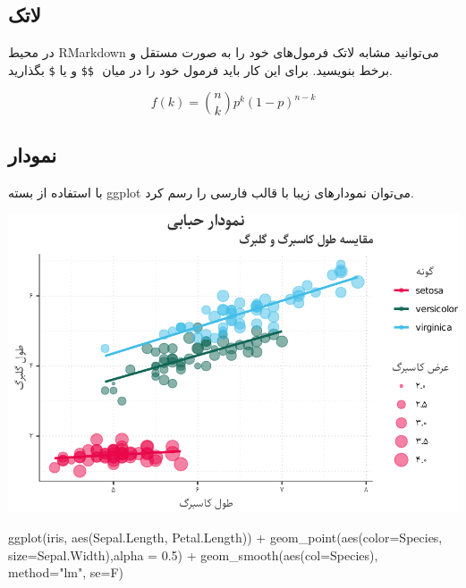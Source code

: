 \documentclass[
]{article}
\newenvironment{Shaded}{\begin{snugshade}}{\end{snugshade}}
\newcommand{\AttributeTok}[1]{\textcolor[rgb]{0.77,0.63,0.00}{#1}}
\newcommand{\FloatTok}[1]{\textcolor[rgb]{0.00,0.00,0.81}{#1}}
\newcommand{\FunctionTok}[1]{\textcolor[rgb]{0.00,0.00,0.00}{#1}}
\newcommand{\NormalTok}[1]{#1}
\newcommand{\SpecialCharTok}[1]{\textcolor[rgb]{0.00,0.00,0.00}{#1}}
\newcommand{\StringTok}[1]{\textcolor[rgb]{0.31,0.60,0.02}{#1}}
\begin{document}
\hypertarget{ux644ux627ux62aux6a9}{%
\subsection{لاتک}\label{ux644ux627ux62aux6a9}}

در محیط RMarkdown می‌توانید مشابه لاتک فرمول‌های خود را به صورت مستقل و
برخط بنویسید. برای این‌ کار باید فرمول خود را در میان ‍‍ ‍‍\texttt{\$\$}
و یا \texttt{\$} بگذارید.

\[f\left(k\right)=\binom{n}{k}p^k\left(1-p\right)^{n-k}\]

\hypertarget{ux646ux645ux648ux62fux627ux631}{%
\subsection{نمودار}\label{ux646ux645ux648ux62fux627ux631}}

با استفاده از بسته ggplot می‌توان نمودارهای زیبا با قالب فارسی را رسم
کرد.

\begin{center}\includegraphics{figure/scatterPlot-1} \end{center}

\begin{Shaded}
\begin{Highlighting}[]
\FunctionTok{ggplot}\NormalTok{(iris, }\FunctionTok{aes}\NormalTok{(Sepal.Length, Petal.Length)) }\SpecialCharTok{+} 
  \FunctionTok{geom\_point}\NormalTok{(}\FunctionTok{aes}\NormalTok{(}\AttributeTok{color=}\NormalTok{Species, }\AttributeTok{size=}\NormalTok{Sepal.Width),}\AttributeTok{alpha =} \FloatTok{0.5}\NormalTok{) }\SpecialCharTok{+}
  \FunctionTok{geom\_smooth}\NormalTok{(}\FunctionTok{aes}\NormalTok{(}\AttributeTok{col=}\NormalTok{Species), }\AttributeTok{method=}\StringTok{"lm"}\NormalTok{, }\AttributeTok{se=}\NormalTok{F)}
\end{Highlighting}
\end{Shaded}
\end{document}
